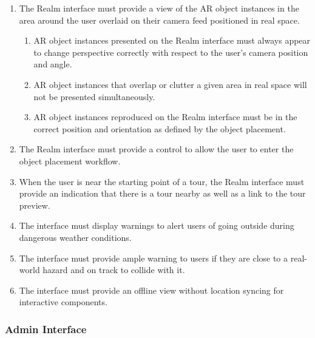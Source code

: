 \documentclass{article}
\begin{document}
\begin{enumerate}[align=left, label=\textbf{RI-FR\arabic*:}]
    \item The Realm interface must provide a view of the AR object instances in the area around the user overlaid on their camera feed positioned in real space.
          \begin{enumerate}[align=left, label=\textbf{RI-FR1.\arabic*:}]
              \item AR object instances presented on the Realm interface must always appear to change perspective correctly with respect to the user’s camera position and angle.
              \item AR object instances that overlap or clutter a given area in real space will not be presented simultaneously.
              \item AR object instances reproduced on the Realm interface must be in the correct position and orientation as defined by the object placement.
          \end{enumerate}

    \item The Realm interface must provide a control to allow the user to enter the object placement workflow.
    \item When the user is near the starting point of a tour, the Realm interface must provide an indication that there is a tour nearby as well as a link to the tour preview.
    \item The interface must display warnings to alert users of going outside during dangerous weather conditions. \\
    \item The interface must provide ample warning to users if they are close to a real-world hazard and on track to collide with it. \\
    \item The interface must provide an offline view without location syncing for interactive components. \\
\end{enumerate}


\subsubsection{Admin Interface}
\label{ssub:admin_interface}
\end{document}

